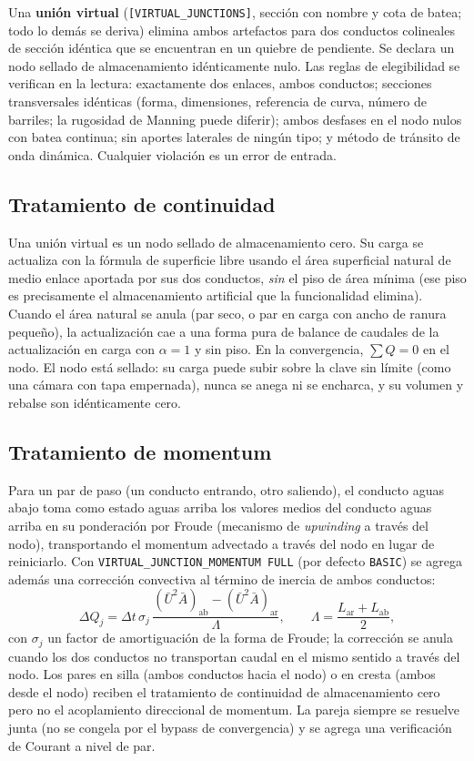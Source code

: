 \documentclass[11pt,a4paper]{article}
\begin{document}
Una \textbf{unión virtual} (\texttt{[VIRTUAL\_JUNCTIONS]}, sección con nombre y
cota de batea; todo lo demás se deriva) elimina ambos artefactos para dos
conductos colineales de sección idéntica que se encuentran en un quiebre de
pendiente. Se declara un nodo sellado de almacenamiento idénticamente nulo. Las
reglas de elegibilidad se verifican en la lectura: exactamente dos enlaces,
ambos conductos; secciones transversales idénticas (forma, dimensiones,
referencia de curva, número de barriles; la rugosidad de Manning puede
diferir); ambos desfases en el nodo nulos con batea continua; sin aportes
laterales de ningún tipo; y método de tránsito de onda dinámica. Cualquier
violación es un error de entrada.

\subsection{Tratamiento de continuidad}

Una unión virtual es un nodo sellado de almacenamiento cero. Su carga se
actualiza con la fórmula de superficie libre usando el área superficial natural
de medio enlace aportada por sus dos conductos, \emph{sin} el piso de área
mínima (ese piso es precisamente el almacenamiento artificial que la
funcionalidad elimina). Cuando el área natural se anula (par seco, o par en
carga con ancho de ranura pequeño), la actualización cae a una forma pura de
balance de caudales de la actualización en carga con $\alpha = 1$ y sin piso.
En la convergencia, $\sum Q = 0$ en el nodo. El nodo está sellado: su carga
puede subir sobre la clave sin límite (como una cámara con tapa empernada),
nunca se anega ni se encharca, y su volumen y rebalse son idénticamente cero.

\subsection{Tratamiento de momentum}

Para un par de paso (un conducto entrando, otro saliendo), el conducto aguas
abajo toma como estado aguas arriba los valores medios del conducto aguas
arriba en su ponderación por Froude (mecanismo de \emph{upwinding} a través
del nodo), transportando el momentum advectado a través del nodo en lugar de
reiniciarlo. Con \texttt{VIRTUAL\_JUNCTION\_MOMENTUM FULL} (por defecto
\texttt{BASIC}) se agrega además una corrección convectiva al término de
inercia de ambos conductos:
\begin{equation}
  \Delta Q_j = \Delta t\,\sigma_j\,
    \frac{\left(\bar U^{2}\bar A\right)_{\mathrm{ab}} -
          \left(\bar U^{2}\bar A\right)_{\mathrm{ar}}}{\Lambda},
  \qquad \Lambda = \frac{L_{\mathrm{ar}} + L_{\mathrm{ab}}}{2},
\end{equation}
con $\sigma_j$ un factor de amortiguación de la forma de Froude; la corrección
se anula cuando los dos conductos no transportan caudal en el mismo sentido a
través del nodo. Los pares en silla (ambos conductos hacia el nodo) o en cresta
(ambos desde el nodo) reciben el tratamiento de continuidad de almacenamiento
cero pero no el acoplamiento direccional de momentum. La pareja siempre se
resuelve junta (no se congela por el bypass de convergencia) y se agrega una
verificación de Courant a nivel de par.
\end{document}
